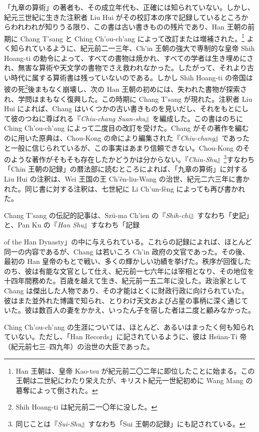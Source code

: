 \documentclass[11pt]{article}
\newcommand{\scanpage}[2]{\clearpage\setcounter{footnote}{0}\noindent{\footnotesize\color{gray}PDF #1 頁 · #2}\par\medskip}
\newcommand{\scanfooter}{}
\begin{document}
「九章の算術」の著者も、その成立年代も、正確には知られていない。しかし、紀元三世紀に生きた注釈者 Liu Hui がその校訂本の序で記録しているところからわれわれが知りうる限り、この書は古い書きものの残片であり、Han 王朝の前期に Chang T'sang と Ching Ch'ou-ch'ang によって改訂または増補された。\footnote{Han 王朝は、皇帝 Kao-tsu が紀元前二〇二年に即位したことに始まる。この王朝は二世紀にわたり栄えたが、キリスト紀元一世紀初めに Wang Mang の簒奪によって倒された。} よく知られているように、紀元前二一三年、Ch'in 王朝の強大で専制的な皇帝 Shih Hoang-ti の勅令によって、すべての書物は焼かれ、すべての学者は生き埋めにされ、無害な算術や天文学の書物でさえ救われなかった。したがって、それより古い時代に属する算術書は残っていないのである。しかし Shih Hoang-ti の帝国は彼の死\footnote{Shih Hoang-ti は紀元前二一〇年に没した。}後まもなく崩壊し、次の Han 王朝の初めには、失われた書物が探索され、学問はまもなく復興した。この時期に Chang T'sang が現れた。注釈者 Liu Hui によれば、Chang はいくつかの古い書きものを見いだし、それをもとにして彼のつねに尊ばれる『\emph{Chiu-chang Suan-shu}』を編成した。この書はのちに Ching Ch'ou-ch'ang によって二度目の改訂を受けた。Chang がその著作を編むのに用いた原典は、Chou-Kong の命により編集された『\emph{Chiu-chang}』であったと一般に信じられているが、この事実はあまり信頼できない。Chou-Kong のそのような著作がそもそも存在したかどうかは分からない。『\emph{Chin-Shu}』\footnote{同じことは『\emph{Sui-Shu}』すなわち「Sui 王朝の記録」にも記されている。}すなわち「Chin 王朝の記録」の暦法部に読むところによれば、「九章の算術」に対する Liu Hui の注釈は、Wei 王国の王 Ch'ên-liu-Wang の治世、紀元二六三年に書かれた。同じ書に対する注釈は、七世紀に Li Ch'un-fêng によっても再び書かれた。

Chang T'sang の伝記的記事は、Szü-ma Ch'ien の『\emph{Shih-chi}』すなわち「史記」と、Pan Ku の『\emph{Han Shu}』すなわち「記録
\scanfooter

\scanpage{0024}{第三章、印刷頁10}
\setcounter{footnote}{0}
of the Han Dynasty」の中に与えられている。これらの記録によれば、ほとんど同一の内容であるが、Chang は若いころ Ch'in 政府の文官であった。その後、最初の Han 皇帝のもとで戦い、多くの輝かしい功績を挙げた。秩序が回復したのち、彼は有能な文官として仕え、紀元前一七六年には宰相となり、その地位を十四年間務めた。百歳を越えて生き、紀元前一五二年に没した。政治家として Chang は傑出した人物であり、その才能はとくに財政行政に向けられていた。彼はまた並外れた博識で知られ、とりわけ天文および占星の事柄に深く通じていた。彼は数百人の妻をかかえ、いったん子を宿した者は二度と顧みなかった。

Ching Ch'ou-ch'ang の生涯については、ほとんど、あるいはまったく何も知られていない。ただし、「Han Records」に記されているように、彼は Hsüan-Ti 帝（紀元前七三--四九年）の治世の大臣であった。
\end{document}
